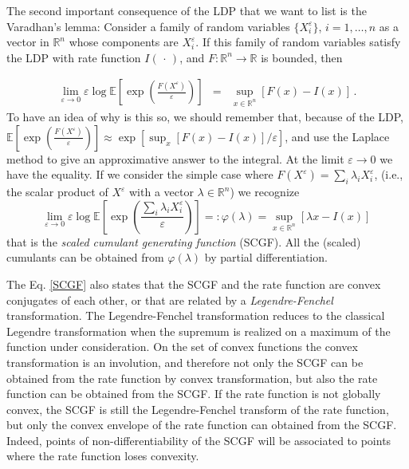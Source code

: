 \documentclass[twocolumn,aps,reprint, nofootinbib]{revtex4}
\begin{document}
The second important consequence of the LDP that we want to list is the Varadhan's lemma: Consider a family of random variables $\{ X_i^{\varepsilon} \}$, $i=1, \ldots, n$ as a vector in $\mathbb{R}^n$ whose components are $X_i^{\varepsilon}$. If this family of random variables satisfy the LDP with rate function $I(\, \cdot \, )$, and $F: \mathbb{R}^n \to \mathbb{R}$ is bounded, then

\begin{eqnarray}
\label{varadhan}
\lim_{\varepsilon \to 0} \varepsilon \log  \mathbb{E} \left[ \exp \left( \frac{F(X^{\varepsilon})}{\varepsilon} \right) \right]  & = & \sup_{x \in \mathbb{R}^n}[F(x) - I(x)] \, .
\end{eqnarray}
To have an idea of why is this so, we should remember that, because of the LDP, $\mathbb{E} \left[ \exp \left( \frac{F(X^{\varepsilon})}{\varepsilon} \right) \right] \approx \exp \left[ \sup_x [F(x) - I(x)]/\varepsilon \right]$, and use the Laplace method to give an approximative answer to the integral. At the limit $\varepsilon \to 0$ we have the equality. If we consider the simple case where $F(X^\varepsilon) = \sum_i \lambda_i X_i^\varepsilon$, (i.e., the scalar product of $X^\varepsilon$ with a vector $\lambda \in \mathbb{R}^n$) we recognize
\begin{equation}
\label{SCGF}
\lim_{\varepsilon \to 0} \varepsilon \log  \mathbb{E} \left[ \exp \left( \frac{\sum_i \lambda_i  X_i^\varepsilon}{\varepsilon} \right) \right] =: \varphi(\lambda) = \sup_{x \in \mathbb{R}^n}[ \lambda x - I(x) ] \, 
\end{equation}
that is the \emph{scaled cumulant generating function} (SCGF). All the (scaled) cumulants can be obtained from $\varphi(\lambda)$ by partial differentiation. 

The Eq. \eqref{SCGF} also states that the SCGF and the rate function are convex conjugates of each other, or that are related by a \emph{Legendre-Fenchel} transformation. The Legendre-Fenchel transformation reduces to the classical Legendre transformation when the supremum is realized on a maximum of the function under consideration. On the set of convex functions the convex transformation is an involution, and therefore not only the SCGF can be obtained from the rate function by convex transformation, but also the rate function can be obtained from the SCGF. If the rate function is not globally convex, the SCGF is still the Legendre-Fenchel transform of the rate function, but only the convex envelope of the rate function can obtained from the SCGF. Indeed, points of non-differentiability of the SCGF will be associated to points where the rate function loses convexity.
\end{document}
